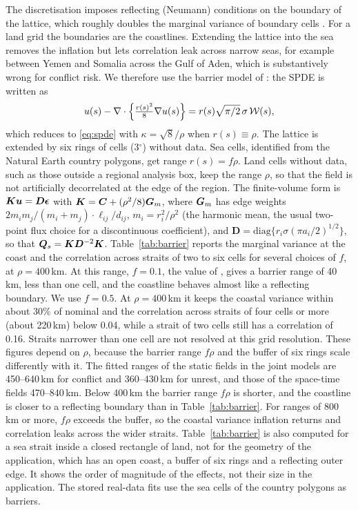 \begin{remark}\label{rem:boundary}
The discretisation imposes reflecting (Neumann) conditions on the boundary of the
lattice, which roughly doubles the marginal variance of boundary cells
\citep[Section~\ref{sec:sim-engine}; see][for the effect of boundary conditions on
SPDE fields]{khristenko2019boundary}. For a land grid the boundaries are the
coastlines. Extending the lattice into the sea removes the inflation but lets
correlation leak across narrow seas, for example between Yemen and Somalia across the
Gulf of Aden, which is substantively wrong for conflict risk. We therefore use the
barrier model of \citet{bakka2019barrier}: the SPDE is written as
\[
u(s) - \nabla\cdot\Bigl\{\tfrac{r(s)^2}{8}\nabla u(s)\Bigr\} = r(s)\sqrt{\pi/2}\,\sigma\,\mathcal{W}(s),
\]
which reduces to \eqref{eq:spde} with $\kappa = \sqrt{8}/\rho$ when
$r(s) \equiv \rho$. The lattice is extended by six rings of cells (3$^\circ$)
without data. Sea cells, identified from the Natural Earth country polygons, get
range $r(s) = f\rho$. Land cells without data, such as those outside a regional
analysis box, keep the range $\rho$, so that the field is not artificially
decorrelated at the edge of the region. The finite-volume form is
$\bm{K}\bm{u} = \bm{D}\bm{\epsilon}$ with $\bm{K} = \bm{C} + (\rho^2/8)\bm{G}_m$, where $\bm{G}_m$
has edge weights $2m_im_j/(m_i + m_j)\cdot\ell_{ij}/d_{ij}$, $m_i = r_i^2/\rho^2$
(the harmonic mean, the usual two-point flux choice for a discontinuous
coefficient), and $\bm{D} = \mathrm{diag}\{r_i\sigma(\pi a_i/2)^{1/2}\}$, so that
$\bm{Q}_s = \bm{K}\bm{D}^{-2}\bm{K}$. Table~\ref{tab:barrier} reports the marginal variance
at the coast and the correlation across straits of two to six cells for several
choices of $f$, at $\rho = 400$\,km. At this range, $f = 0.1$, the value of
\citet{bakka2019barrier}, gives a barrier range of 40\,km, less than one cell, and
the coastline behaves almost like a reflecting boundary. We use $f = 0.5$. At
$\rho = 400$\,km it keeps the coastal variance within about 30\% of nominal and the
correlation across straits of four cells or more (about 220\,km) below 0.04, while
a strait of two cells still has a correlation of 0.16. Straits narrower than one
cell are not resolved at this grid resolution. These figures depend on $\rho$,
because the barrier range $f\rho$ and the buffer of six rings scale differently with
it. The fitted ranges of the static fields in the joint models are 450--640\,km for
conflict and 360--430\,km for unrest, and those of the space-time fields 470--840\,km.
Below 400\,km the barrier range $f\rho$ is shorter, and the coastline is closer to a
reflecting boundary than in Table~\ref{tab:barrier}. For ranges of 800\,km or more,
$f\rho$ exceeds the buffer, so the coastal variance inflation returns and correlation
leaks across the wider straits. Table~\ref{tab:barrier} is also computed for a
sea strait inside a closed rectangle of land, not for the geometry of the application,
which has an open coast, a buffer of six rings and a reflecting outer edge. It shows
the order of magnitude of the effects, not their size in the application. The stored
real-data fits use the sea cells of the country polygons as barriers.
\end{remark}

